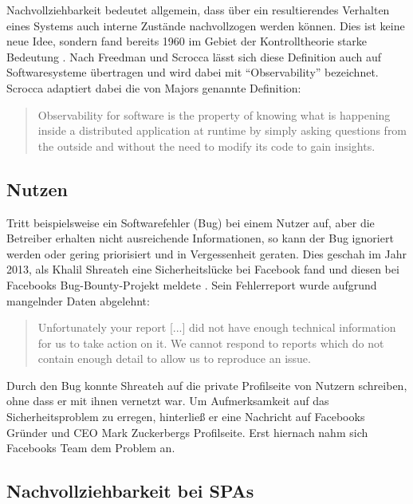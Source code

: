 Nachvollziehbarkeit bedeutet allgemein, dass über ein resultierendes Verhalten eines Systems auch interne Zustände nachvollzogen werden können. Dies ist keine neue Idee, sondern fand bereits 1960 im Gebiet der Kontrolltheorie starke Bedeutung \cite{OnTheGeneralTheoryOfControlSystems}. Nach Freedman \cite{TestabilityOfSoftwareComponents} und Scrocca \etal \cite{TheKaijuProjectPaper} lässt sich diese Definition auch auf Softwaresysteme übertragen und wird dabei mit \enquote{Observability} bezeichnet. Scrocca adaptiert dabei die von Majors genannte Definition:

\begin{quotation}
Observability for software is the property of knowing what is happening inside a distributed application at runtime by simply asking questions from the outside and without the need to modify its code to gain insights.
\end{quotation}

\vspace{-0.5\baselineskip}
\subsection{Nutzen}

Tritt beispielsweise ein Softwarefehler (Bug) bei einem Nutzer auf, aber die Betreiber erhalten nicht ausreichende Informationen, so kann der Bug ignoriert werden oder gering priorisiert und in Vergessenheit geraten. Dies geschah im Jahr 2013, als Khalil Shreateh eine Sicherheitslücke bei Facebook fand und diesen bei Facebooks Bug-Bounty-Projekt meldete \cite{FacebookBugBounyHunt}. Sein Fehlerreport wurde aufgrund mangelnder Daten abgelehnt:

\begin{quotation}
Unfortunately your report [...] did not have enough technical information for us to take action  on  it. We  cannot  respond  to  reports  which  do  not contain enough detail to allow us to reproduce an issue.
\end{quotation}

Durch den Bug konnte Shreateh auf die private Profilseite von Nutzern schreiben, ohne dass er mit ihnen vernetzt war. Um Aufmerksamkeit auf das Sicherheitsproblem zu erregen, hinterließ er eine Nachricht auf Facebooks Gründer und CEO Mark Zuckerbergs Profilseite. Erst hiernach nahm sich Facebooks Team dem Problem an.

\vspace{-0.5\baselineskip}
\subsection{Nachvollziehbarkeit bei SPAs}

